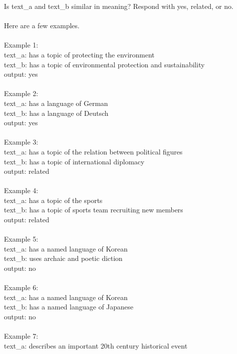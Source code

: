 \begin{figure*}[!htb]
\centering\small
\begin{tcolorbox}[colback=blue!5!white, colframe=blue!75!black, boxrule=0.5mm, arc=4mm, boxsep=5pt, width=\textwidth]
Is text\_a and text\_b similar in meaning? Respond with yes, related, or no. \\
\\
Here are a few examples. \\
\\
Example 1: \\
text\_a: has a topic of protecting the environment \\
text\_b: has a topic of environmental protection and sustainability \\
output: yes \\
\\
Example 2: \\
text\_a: has a language of German \\
text\_b: has a language of Deutsch \\
output: yes \\
\\
Example 3: \\
text\_a: has a topic of the relation between political figures \\
text\_b: has a topic of international diplomacy \\
output: related \\
\\
Example 4: \\
text\_a: has a topic of the sports \\
text\_b: has a topic of sports team recruiting new members \\
output: related \\
\\
Example 5: \\
text\_a: has a named language of Korean \\
text\_b: uses archaic and poetic diction \\
output: no \\
\\
Example 6: \\
text\_a: has a named language of Korean \\
text\_b: has a named language of Japanese \\
output: no \\
\\
Example 7: \\
text\_a: describes an important 20th century historical event \\

\end{tcolorbox}
\end{figure*}
